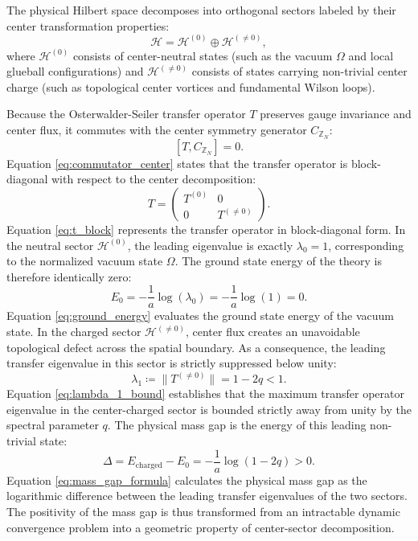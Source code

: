 \documentclass[11pt,reqno]{amsart}
\theoremstyle{plain}
\theoremstyle{definition}
\theoremstyle{remark}
\numberwithin{equation}{section}
\begin{document}
The physical Hilbert space decomposes into orthogonal sectors labeled by their center transformation properties:
\begin{equation}
\label{eq:hilbert_decomposition}
\mathcal{H} = \mathcal{H}^{(0)} \oplus \mathcal{H}^{(\ne 0)},
\end{equation}
where $\mathcal{H}^{(0)}$ consists of center-neutral states (such as the vacuum $\Omega$ and local glueball configurations) and $\mathcal{H}^{(\ne 0)}$ consists of states carrying non-trivial center charge (such as topological center vortices and fundamental Wilson loops).

Because the Osterwalder-Seiler transfer operator $T$ preserves gauge invariance and center flux, it commutes with the center symmetry generator $C_{\mathbb{Z}_N}$:
\begin{equation}
\label{eq:commutator_center}
[T, C_{\mathbb{Z}_N}] = 0.
\end{equation}
Equation \eqref{eq:commutator_center} states that the transfer operator is block-diagonal with respect to the center decomposition:
\begin{equation}
\label{eq:t_block}
T = \begin{pmatrix} T^{(0)} & 0 \\ 0 & T^{(\ne 0)} \end{pmatrix}.
\end{equation}
Equation \eqref{eq:t_block} represents the transfer operator in block-diagonal form. In the neutral sector $\mathcal{H}^{(0)}$, the leading eigenvalue is exactly $\lambda_0 = 1$, corresponding to the normalized vacuum state $\Omega$. The ground state energy of the theory is therefore identically zero:
\begin{equation}
\label{eq:ground_energy}
E_0 = - \frac{1}{a} \log(\lambda_0) = - \frac{1}{a} \log(1) = 0.
\end{equation}
Equation \eqref{eq:ground_energy} evaluates the ground state energy of the vacuum state. In the charged sector $\mathcal{H}^{(\ne 0)}$, center flux creates an unavoidable topological defect across the spatial boundary. As a consequence, the leading transfer eigenvalue in this sector is strictly suppressed below unity:
\begin{equation}
\label{eq:lambda_1_bound}
\lambda_1 \coloneqq \| T^{(\ne 0)} \| = 1 - 2q < 1.
\end{equation}
Equation \eqref{eq:lambda_1_bound} establishes that the maximum transfer operator eigenvalue in the center-charged sector is bounded strictly away from unity by the spectral parameter $q$. The physical mass gap is the energy of this leading non-trivial state:
\begin{equation}
\label{eq:mass_gap_formula}
\Delta = E_{\mathrm{charged}} - E_0 = - \frac{1}{a} \log(1 - 2q) > 0.
\end{equation}
Equation \eqref{eq:mass_gap_formula} calculates the physical mass gap as the logarithmic difference between the leading transfer eigenvalues of the two sectors. The positivity of the mass gap is thus transformed from an intractable dynamic convergence problem into a geometric property of center-sector decomposition.
\end{document}

